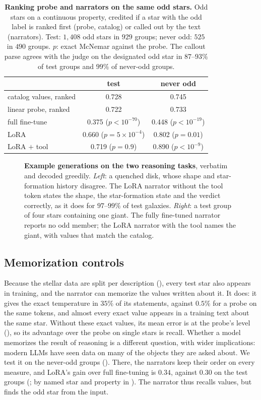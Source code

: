 \begin{table}[h]\centering\small
\caption{\textbf{Ranking probe and narrators on the same odd stars.} Odd stars on a
continuous property, credited if a star with the odd label is ranked first (probe, catalog) or
called out by the text (narrators). Test: $1{,}408$ odd stars in $929$ groups; never odd: $525$
in $490$ groups. $p$: exact McNemar against the probe. The callout parse agrees with the judge
on the designated odd star in $87$--$93\%$ of test groups and $99\%$ of never-odd groups.}
\label{tab:probegroup}
\begin{tabular}{lcc}
\toprule
 & test & never odd \\
\midrule
catalog values, ranked & 0.728 & 0.745 \\
linear probe, ranked   & 0.722 & 0.733 \\
\midrule
full fine-tune         & 0.375 ($p<10^{-70}$) & 0.448 ($p<10^{-19}$) \\
LoRA                   & 0.660 ($p=5\times10^{-4}$) & 0.802 ($p=0.01$) \\
LoRA $+$ tool          & 0.719 ($p=0.9$) & 0.890 ($p<10^{-9}$) \\
\bottomrule
\end{tabular}
\end{table}

\begin{figure}[t]
  \centering
  
  \caption{\textbf{Example generations on the two reasoning tasks}, verbatim and
  decoded greedily. \emph{Left}: a quenched disk, whose shape and star-formation
  history disagree. The LoRA narrator without the tool token states the shape,
  the star-formation state and the verdict correctly, as it does for $97$--$99\%$
  of test galaxies. \emph{Right}: a test group of four stars containing one giant.
  The fully fine-tuned narrator reports no odd member; the LoRA narrator with the tool
  names the giant, with values that match the catalog.}
  \label{fig:examples}
\end{figure}

\subsection{Memorization controls}\label{sec:memorization}
Because the stellar data are split per description (), every test star also
appears in training, and the narrator can memorize the values written about it. It does: it
gives the exact temperature in $35\%$ of its statements, against $0.5\%$ for a probe on the same
tokens, and almost every exact value appears in a training text about the same star. Without
these exact values, its mean error is at the probe's level (), so its advantage
over the probe on single stars is recall. Whether a model memorizes the result of reasoning is a different
question, with wider implications: modern LLMs have seen data on many of the objects they are
asked about. We test it on the never-odd groups (). There, the narrators
keep their order on every measure, and LoRA's gain over full fine-tuning is $0.34$, against $0.30$
on the test groups (; by named star and property in ). The narrator thus recalls values, but finds the odd
star from the input.
